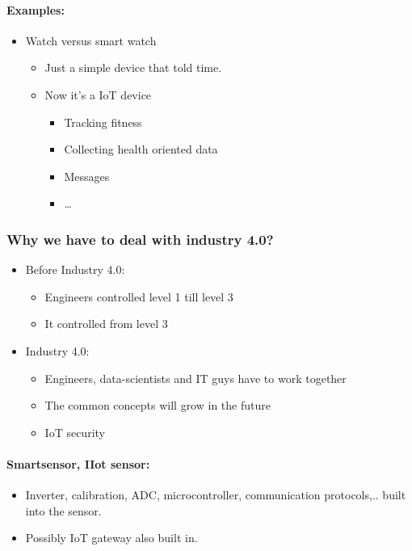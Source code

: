 \documentclass[12pt]{article}
\begin{document}
\paragraph{Examples:}
\begin{itemize}
    \item Watch versus smart watch\begin{itemize}
        \item Just a simple device that told time.
        \item Now it's a IoT device\begin{itemize}
            \item Tracking fitness
            \item Collecting health oriented data
            \item Messages
            \item \dots
        \end{itemize}
    \end{itemize}
\end{itemize}
\subsubsection{Why we have to deal with industry 4.0?}
\begin{itemize}
    \item Before Industry 4.0:\begin{itemize}
        \item Engineers controlled level 1 till level 3
        \item It controlled from level 3
    \end{itemize}
    \item Industry 4.0:\begin{itemize}
        \item Engineers, data-scientists and IT guys have to work together
        \item The common concepts will grow in the future
        \item IoT security
    \end{itemize}
\end{itemize}
\paragraph{Smartsensor, IIot sensor:}
\begin{itemize}
    \item Inverter, calibration, ADC, microcontroller,
    communication protocols,.. built into the sensor.
    \item Possibly IoT gateway also built in.
\end{itemize}
\end{document}
